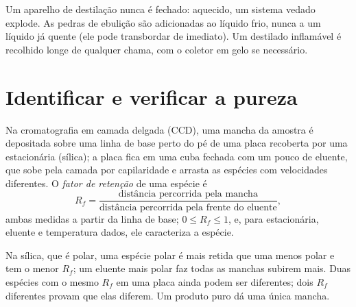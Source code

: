 \begin{safety}{}
Um aparelho de destilação nunca é fechado: aquecido, um sistema vedado
explode. As pedras de ebulição são adicionadas ao líquido frio, nunca a
um líquido já quente (ele pode transbordar de imediato). Um destilado
inflamável é recolhido longe de qualquer chama, com o coletor em gelo se
necessário.
\end{safety}

\section{Identificar e verificar a pureza}

\begin{definition}\label{def:b1:lab-techniques-1:retention-factor}
Na cromatografia em camada delgada (CCD), uma mancha da amostra é
depositada sobre uma linha de base perto do pé de uma placa recoberta por
uma  estacionária (sílica); a placa fica em uma cuba fechada com um
pouco de eluente, que sobe pela camada por capilaridade e arrasta as
espécies com velocidades diferentes. O \emph{fator de retenção} de uma
espécie é
\[
  R_f = \frac{\text{distância percorrida pela mancha}}
             {\text{distância percorrida pela frente do eluente}},
\]
ambas medidas a partir da linha de base; $0 \le R_f \le 1$, e, para 
estacionária, eluente e temperatura dados, ele caracteriza a espécie.
\end{definition}

Na sílica, que é polar, uma espécie polar é mais retida que uma menos
polar e tem o menor $R_f$; um eluente mais polar faz todas as manchas
subirem mais. Duas espécies com o mesmo $R_f$ em uma placa ainda podem
ser diferentes; dois $R_f$ diferentes provam que elas diferem. Um produto
puro dá uma única mancha.

